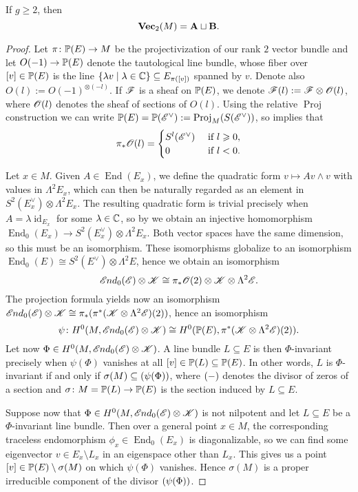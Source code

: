 \documentclass[A4paper, 12pt, british, reqno]{amsart}
\DeclareMathOperator{\End}{End}
\DeclareMathOperator{\Proj}{Proj}
\DeclareMathOperator{\id}{id}
\let\div\relax
\DeclareMathOperator{\div}{div}
\newcommand{\ot}{\otimes}
\newcommand{\dual}{^{\vee}}
\begin{document}
\begin{lm}\label{lm:twocases}
    If $g\geqslant 2$, then
    \[ \Vec_{2}(M)=\bfA\sqcup \bfB. \]
    \begin{proof}
	Let $\pi\colon \P(E)\to M$ be the projectivization of our rank $2$ vector bundle and let $O(-1)\to \P(E)$ denote the tautological line bundle, whose fiber over $[v]\in \P(E)$ is the line $\{\lambda v\mid \lambda\in \C\}\subseteq E_{\pi([v])}$ spanned by $v$.
	Denote also $O(l):=O(-1)^{\ot (-l)}$.
	If $\F$ is a sheaf on $\P(E)$, we denote $\F(l):=\F\ot \O(l)$, where $\O(l)$ denotes the sheaf of sections of $O(l)$.
	Using the relative $\Proj$ construction we can write $\P(E)=\P(\E\dual):=\Proj_{M}(S(\E\dual))$, so \cite[Exercise III.8.4]{har77} implies that
	\[ \pi_{*}\O(l)=\begin{cases} S^{l}(\E\dual) & \text{ if } l\geqslant 0, \\
	    0 & \text{ if }l<0.
	\end{cases}
	\]

	Let $x\in M$.
	Given $A\in \End(E_{x})$, we define the quadratic form $v\mapsto Av\wedge v$ with values in $\Lambda^{2}E_{x}$, which can then be naturally regarded as an element in $S^{2}(E_{x}\dual)\ot\Lambda^{2}E_{x}$.
	The resulting quadratic form is trivial precisely when $A=\lambda\id_{E_{x}}$ for some $\lambda\in \C$, so by  we obtain an injective homomorphism $\End_{0}(E_{x})\to S^{2}(E_{x}\dual)\ot \Lambda^{2}E_{x}$.
	Both vector spaces have the same dimension, so this must be an isomorphism.
	These isomorphisms globalize to an isomorphism $\End_{0}(E)\cong S^{2}(E\dual)\ot \Lambda^{2}E$, hence we obtain an isomorphism
	\[ \sEnd_{0}(\E)\ot \sK\cong \pi_{*}\O(2)\ot \sK \ot \Lambda^{2}\E. \]
	The projection formula yields now an isomorphism $\sEnd_{0}(\E)\ot \sK\cong \pi_{*}(\pi^{*}(\sK\ot \Lambda^{2}\E)(2))$, hence an isomorphism
	\[ \psi \colon H^{0}(M,\sEnd_{0}(\E)\ot \sK)\cong H^{0}(\P(E),\pi^{*}(\sK\ot \Lambda^{2}\E)(2)). \]
	Let now $\Phi\in H^{0}(M,\sEnd_{0}(\E)\ot \sK)$.
	A line bundle $L\subseteq E$ is then $\Phi$-invariant precisely when $\psi(\Phi)$ vanishes at all $[v]\in \P(L)\subseteq \P(E)$.
	In other words, $L$ is $\Phi$-invariant if and only if $\sigma(M)\subseteq \div(\psi(\Phi))$, where $\div(-)$ denotes the divisor of zeros of a section and $\sigma\colon M=\P(L)\to \P(E)$ is the section induced by $L\subseteq E$.

	Suppose now that $\Phi\in H^{0}(M,\sEnd_{0}(\E)\ot \sK)$ is not nilpotent and let $L\subseteq E$ be a $\Phi$-invariant line bundle.
	Then over a general point $x\in M$, the corresponding traceless endomorphism $\phi_{x}\in \End_{0}(E_{x})$ is diagonalizable, so we can find some eigenvector $v\in E_{x}\setminus L_{x}$ in an eigenspace other than $L_{x}$.
	This gives us a point $[v]\in \P(E)\setminus \sigma(M)$ on which $\psi(\Phi)$ vanishes.
	Hence $\sigma(M)$ is a proper irreducible component of the divisor $\div(\psi(\Phi))$.


\end{proof}
\end{lm}
\end{document}
